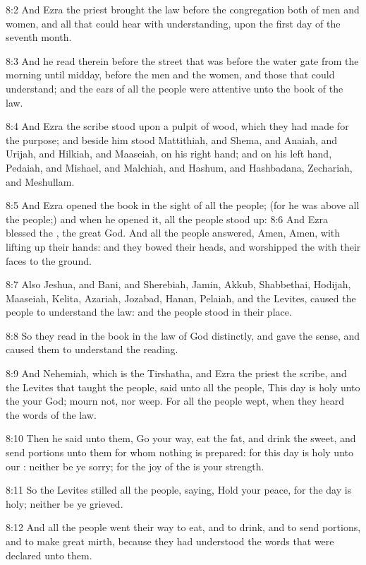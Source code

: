 8:2 And Ezra the priest brought the law before the congregation both of men and women, and all that could hear with understanding, upon the first day of the seventh month.

8:3 And he read therein before the street that was before the water gate from the morning until midday, before the men and the women, and those that could understand; and the ears of all the people were attentive unto the book of the law.

8:4 And Ezra the scribe stood upon a pulpit of wood, which they had made for the purpose; and beside him stood Mattithiah, and Shema, and Anaiah, and Urijah, and Hilkiah, and Maaseiah, on his right hand; and on his left hand, Pedaiah, and Mishael, and Malchiah, and Hashum, and Hashbadana, Zechariah, and Meshullam.

8:5 And Ezra opened the book in the sight of all the people; (for he was above all the people;) and when he opened it, all the people stood up: 8:6 And Ezra blessed the \LORD, the great God. And all the people answered, Amen, Amen, with lifting up their hands: and they bowed their heads, and worshipped the \LORD with their faces to the ground.

8:7 Also Jeshua, and Bani, and Sherebiah, Jamin, Akkub, Shabbethai, Hodijah, Maaseiah, Kelita, Azariah, Jozabad, Hanan, Pelaiah, and the Levites, caused the people to understand the law: and the people stood in their place.

8:8 So they read in the book in the law of God distinctly, and gave the sense, and caused them to understand the reading.

8:9 And Nehemiah, which is the Tirshatha, and Ezra the priest the scribe, and the Levites that taught the people, said unto all the people, This day is holy unto the \LORD your God; mourn not, nor weep.  For all the people wept, when they heard the words of the law.

8:10 Then he said unto them, Go your way, eat the fat, and drink the sweet, and send portions unto them for whom nothing is prepared: for this day is holy unto our \LORD: neither be ye sorry; for the joy of the \LORD is your strength.

8:11 So the Levites stilled all the people, saying, Hold your peace, for the day is holy; neither be ye grieved.

8:12 And all the people went their way to eat, and to drink, and to send portions, and to make great mirth, because they had understood the words that were declared unto them.

